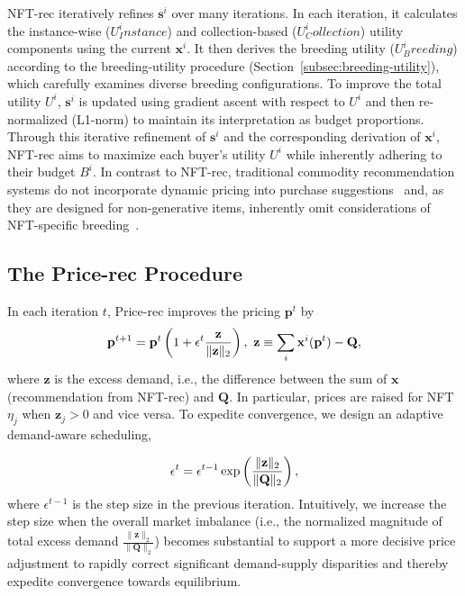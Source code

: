 \documentclass[conference]{IEEEtran}
\theoremstyle{plain}
\newcommand*{\defeq}{\equiv}
\begin{document}
    NFT-rec iteratively refines $\mathbf{s}^i$ over many iterations. In each iteration, it calculates the instance-wise ($U^i_Instance$) and collection-based ($U^i_Collection$) utility components using the current $\mathbf{x}^i$. It then derives the breeding utility ($U^i_Breeding$) according to the breeding-utility procedure (Section~\ref{subsec:breeding-utility}), which carefully examines diverse breeding configurations. To improve the total utility $U^i$, $\mathbf{s}^i$ is updated using gradient ascent with respect to $U^i$ and then re-normalized (L1-norm) to maintain its interpretation as budget proportions. Through this iterative refinement of $\mathbf{s}^i$ and the corresponding derivation of $\mathbf{x}^i$, NFT-rec aims to maximize each buyer's utility $U^i$ while inherently adhering to their budget $B^i$. In contrast to NFT-rec, traditional commodity recommendation systems do not incorporate dynamic pricing into purchase suggestions~\cite{he2020lightgcn, wang2019neural, zhang2019deep} and, as they are designed for non-generative items, inherently omit considerations of NFT-specific breeding~\cite{he2020lightgcn, wang2019neural, zhang2019deep, koren2009matrix, chen2019personalized}.

\subsection{The Price-rec Procedure}
\label{subsec:findprice}

In each iteration $t$, Price-rec improves the pricing $\mathbf{p}^t$ by 
\begin{equation}\small
        \label{eqn:update-rule}
        \mathbf{p}^{t+1} = \mathbf{p}^t\left(1 + \epsilon^t\frac{\mathbf{z}}{\lVert\mathbf{z}\rVert_2}\right),\,\,
        \mathbf{z} \defeq \sum_i \mathbf{x}^i(\mathbf{p}^t) - \mathbf{Q},
    \end{equation}    
    where $\mathbf{z}$ is the excess demand, i.e., the difference between the sum of $\mathbf{x}$ (recommendation from NFT-rec) and $\mathbf{Q}$. In particular, prices are raised for NFT $\eta_j$ when $\mathbf{z}_j>0$ and vice versa. To expedite convergence, we design an adaptive demand-aware scheduling, 

    \begin{equation}\small
    \label{eqn:ba-stepsize}
        \epsilon^t = \epsilon^{t-1} \exp\left(

        \frac{\lVert\mathbf{z}\rVert_2}{\lVert\mathbf{Q}\rVert_2}
        \right),
    \end{equation}
    where $\epsilon^{t-1}$ is the step size in the previous iteration. 
    Intuitively, we increase the step size when the overall market imbalance (i.e., the normalized magnitude of total excess demand $\frac{\lVert\mathbf{z}\rVert_2}{\lVert\mathbf{Q}\rVert_2}$) becomes substantial to support a more decisive price adjustment to rapidly correct significant demand-supply disparities and thereby expedite convergence towards equilibrium.
\end{document}
